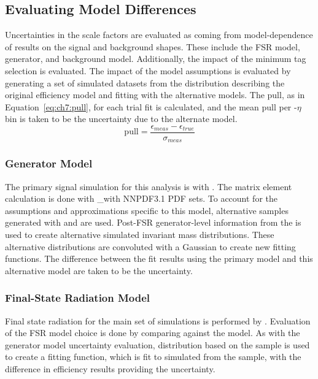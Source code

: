 \subsection{Evaluating Model Differences}
Uncertainties in the scale factors are evaluated as coming from model-dependence of results on the signal and background shapes. These include the FSR model, generator, and background model. Additionally, the impact of the minimum tag selection \pt is evaluated. 
The impact of the model assumptions is evaluated by generating a set of simulated datasets from the \mll distribution describing the original efficiency model and fitting with the alternative models. The pull, as in Equation~\ref{eq:ch7:pull}, for each trial fit is calculated, and the mean pull per \pt-$\eta$ bin is taken to be the uncertainty due to the alternate model. 
\begin{equation}
\mathrm{pull}=\frac{\epsilon_{meas}-\epsilon_{true}}{\sigma_{meas}}
    \label{eq:ch7:pull}
\end{equation}

\subsubsection{Generator Model}
The primary signal simulation for this analysis is \aMCATNLO with . The matrix element calculation is done with \_\aMCATNLO with NNPDF3.1 PDF sets. To account for the assumptions and approximations specific to this model, alternative samples generated with \POWHEG and  are used. Post-FSR generator-level information from the \POWHEG is used to create alternative simulated invariant mass distributions. These alternative \mll distributions are convoluted with a Gaussian to create new fitting functions. The difference between the fit results using the primary model and this alternative model are taken to be the uncertainty. 

\subsubsection{Final-State Radiation Model}
Final state radiation for the main set of simulations is performed by . Evaluation of the FSR model choice is done by comparing \PYTHIA against the \PHOTOS model. As with the generator model uncertainty evaluation, \mll distribution based on the \PHOTOS sample is used to create a fitting function, which is fit to simulated \mll from the \PYTHIA sample, with the difference in efficiency results providing the uncertainty.

